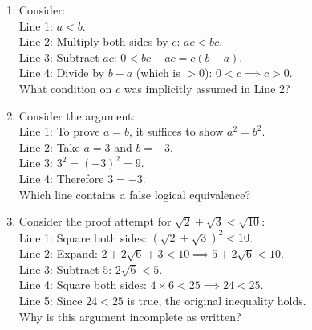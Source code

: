 \documentclass[11pt,a4paper]{article}
\begin{document}
\begin{enumerate}

\item Consider:\\
Line 1: $a < b$.\\
Line 2: Multiply both sides by $c$: $ac < bc$.\\
Line 3: Subtract $ac$: $0 < bc - ac = c(b-a)$.\\
Line 4: Divide by $b-a$ (which is $>0$): $0 < c \implies c > 0$.\\
What condition on $c$ was implicitly assumed in Line 2?


\item Consider the argument:\\
Line 1: To prove $a=b$, it suffices to show $a^2 = b^2$.\\
Line 2: Take $a = 3$ and $b = -3$.\\
Line 3: $3^2 = (-3)^2 = 9$.\\
Line 4: Therefore $3 = -3$.\\
Which line contains a false logical equivalence?


\item Consider the proof attempt for $\sqrt{2} + \sqrt{3} < \sqrt{10}$:\\
Line 1: Square both sides: $(\sqrt{2}+\sqrt{3})^2 < 10$.\\
Line 2: Expand: $2 + 2\sqrt{6} + 3 < 10 \implies 5 + 2\sqrt{6} < 10$.\\
Line 3: Subtract $5$: $2\sqrt{6} < 5$.\\
Line 4: Square both sides: $4 \times 6 < 25 \implies 24 < 25$.\\
Line 5: Since $24 < 25$ is true, the original inequality holds.\\
Why is this argument incomplete as written?


\end{enumerate}
\end{document}
